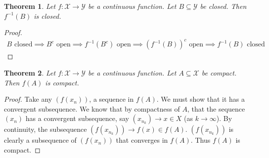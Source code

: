 \documentclass[11pt]{article}
\newcommand{\X}{\ensuremath{\mathcal X}}
\newcommand{\Y}{\ensuremath{\mathcal Y}}
\newcommand{\sse}{\subseteq}
\theoremstyle{plain}
\newtheorem{thm}{Theorem}[section]
\theoremstyle{definition}
\theoremstyle{remark}
\begin{document}
\begin{thm}
    Let $f: \X \rightarrow \Y$ be a continuous function. Let $B \sse \Y$ be closed. Then $f^{-1}(B)$ is closed.
\end{thm}
\begin{proof}
    \begin{align*}
        B \text{ closed} \implies B^c \text{ open} \implies f^{-1}(B^c) \text{ open} \implies (f^{-1}(B))^c \text{ open} \implies f^{-1}(B) \text{ closed}
    \end{align*}
\end{proof}

\begin{thm}
    Let $f: \X \rightarrow \Y$ be a continuous function. Let $A \sse \X$ be compact. Then $f(A)$ is compact.
\end{thm}
\begin{proof}
    Take any $(f(x_n))$, a sequence in $f(A)$. We must show that it has a convergent subsequence. We know that by compactness of $A$, that the sequence $(x_n)$ has a convergent subsequence, say $(x_{n_k}) \rightarrow x \in X$ (as $k \rightarrow \infty$). By continuity, the subsequence $(f(x_{n_k})) \rightarrow f(x) \in f(A)$. $(f(x_{n_k}))$ is clearly a subsequence of $(f(x_n))$ that converges in $f(A)$. Thus $f(A)$ is compact.
\end{proof}
\end{document}
